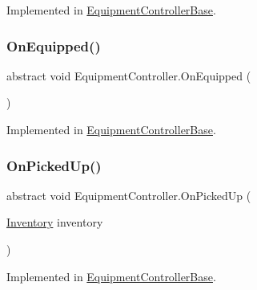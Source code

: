 Implemented in \mbox{\hyperlink{class_equipment_controller_base_a8d45225cd0b3e6e07dec3eda588b7df1}{Equipment\+Controller\+Base}}.

\mbox{\label{class_equipment_controller_acba8245d13e2339ef752de1945e21752}} 
\subsubsection{\texorpdfstring{On\+Equipped()}{OnEquipped()}}
{\footnotesize\ttfamily abstract void Equipment\+Controller.\+On\+Equipped (\begin{DoxyParamCaption}{ }\end{DoxyParamCaption})\hspace{0.3cm}{\ttfamily [pure virtual]}}



Implemented in \mbox{\hyperlink{class_equipment_controller_base_a6518be3369d4118d4617c70c70fad38e}{Equipment\+Controller\+Base}}.

\mbox{\label{class_equipment_controller_a4e0b167b8b3365bb6711b19195143fb6}} 
\subsubsection{\texorpdfstring{On\+Picked\+Up()}{OnPickedUp()}}
{\footnotesize\ttfamily abstract void Equipment\+Controller.\+On\+Picked\+Up (\begin{DoxyParamCaption}\item[{\mbox{\hyperlink{class_inventory}{Inventory}}}]{inventory }\end{DoxyParamCaption})\hspace{0.3cm}{\ttfamily [pure virtual]}}



Implemented in \mbox{\hyperlink{class_equipment_controller_base_a357889ef978abc906de8d5b36b26d613}{Equipment\+Controller\+Base}}.

\mbox{\label{class_equipment_controller_a93e833692f74ffcda9f56f15e5f4e63d}} 
